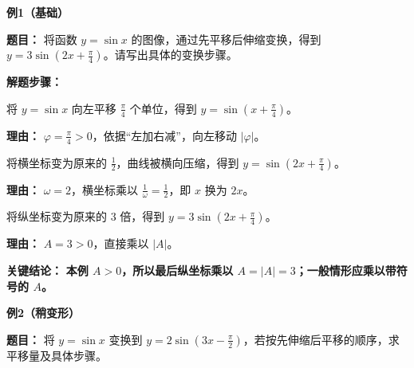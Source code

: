 \begin{examplebox}
	\textbf{\textcolor{CExample}{例1（基础）}}

	\textbf{\textcolor{CExample}{题目：}}
	将函数 $y=\sin x$ 的图像，通过先平移后伸缩变换，得到 $y=3\sin(2x+\frac{\pi}{4})$。请写出具体的变换步骤。

	\textbf{\textcolor{CExample}{解题步骤：}}
	\begin{description}[style=nextline, leftmargin=2.8em, labelsep=0.5em, itemsep=0.45em]
		\item[\textbf{第一步（平移相位）：}] 将 $y=\sin x$ 向左平移 $\frac{\pi}{4}$ 个单位，得到 $y=\sin(x+\frac{\pi}{4})$。
			\par\textbf{理由：}
			$\varphi=\frac{\pi}{4}>0$，依据“左加右减”，向左移动 $|\varphi|$。
		\item[\textbf{第二步（横缩周期）：}] 将横坐标变为原来的 $\frac{1}{2}$，曲线被横向压缩，得到 $y=\sin(2x+\frac{\pi}{4})$。
			\par\textbf{理由：}
			$\omega=2$，横坐标乘以 $\frac{1}{\omega}=\frac{1}{2}$，即 $x$ 换为 $2x$。
		\item[\textbf{第三步（纵缩振幅）：}] 将纵坐标变为原来的 $3$ 倍，得到 $y=3\sin(2x+\frac{\pi}{4})$。
			\par\textbf{理由：}
			$A=3>0$，直接乘以 $|A|$。
	\end{description}

	\textbf{\textcolor{CExample}{关键结论：}}
	\textbf{本例 $A>0$，所以最后纵坐标乘以 $A=|A|=3$；一般情形应乘以带符号的 $A$。}

	\medskip
	\textbf{\textcolor{CExample}{例2（稍变形）}}

	\textbf{\textcolor{CExample}{题目：}}
	将 $y=\sin x$ 变换到 $y=2\sin(3x-\frac{\pi}{2})$，若按先伸缩后平移的顺序，求平移量及具体步骤。


\end{examplebox}
